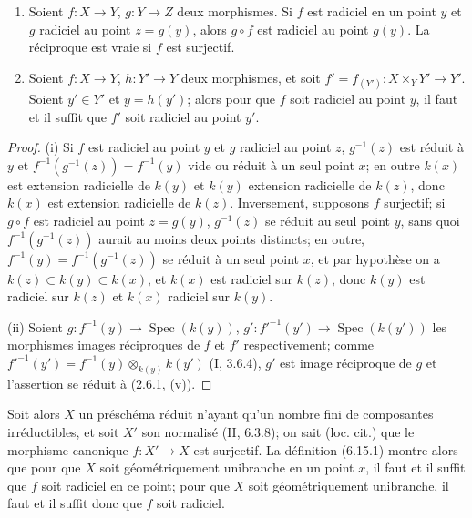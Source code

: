 \begin{lemma}[6.15.3.1]
\label{IV.2.s6.15.3.1-fr}
\begin{enumerate}
\item[(i)] Soient $f:X\to Y$, $g:Y\to Z$ deux morphismes. Si $f$ est
radiciel en un point $y$ et $g$ radiciel au point $z=g(y)$, alors $g\circ f$
est radiciel au point $g(y)$. La réciproque est vraie si $f$ est surjectif.
\item[(ii)] Soient $f:X\to Y$, $h:Y'\to Y$ deux morphismes, et soit
$f'=f_{(Y')}:X\times_Y Y'\to Y'$. Soient $y'\in Y'$ et $y=h(y')$; alors
pour que $f$ soit radiciel au point $y$, il faut et il suffit que $f'$ soit
radiciel au point $y'$.
\end{enumerate}
\end{lemma}

\begin{proof}
(i) Si $f$ est radiciel au point $y$ et $g$ radiciel au point $z$,
$g^{-1}(z)$ est réduit à $y$ et
$f^{-1}(g^{-1}(z))=f^{-1}(y)$ vide ou réduit à un seul point $x$; en
outre $k(x)$ est extension radicielle de $k(y)$ et $k(y)$ extension
radicielle de $k(z)$, donc $k(x)$ est extension radicielle de $k(z)$.
Inversement, supposons $f$ surjectif; si $g\circ f$ est radiciel au point
$z=g(y)$, $g^{-1}(z)$ se réduit au seul point $y$, sans quoi
$f^{-1}(g^{-1}(z))$ aurait au moins deux points distincts; en outre,
$f^{-1}(y)=f^{-1}(g^{-1}(z))$ se réduit à un seul point $x$, et par
hypothèse on a $k(z)\subset k(y)\subset k(x)$, et $k(x)$ est radiciel sur
$k(z)$, donc $k(y)$ est radiciel sur $k(z)$ et $k(x)$ radiciel sur $k(y)$.

(ii) Soient $g:f^{-1}(y)\to\operatorname{Spec}(k(y))$,
$g':f'^{-1}(y')\to\operatorname{Spec}(k(y'))$ les morphismes images
réciproques de $f$ et $f'$ respectivement; comme
$f'^{-1}(y')=f^{-1}(y)\otimes_{k(y)}k(y')$ (I, 3.6.4), $g'$ est image
réciproque de $g$ et l'assertion se réduit à (2.6.1, (v)).
\end{proof}

Soit alors $X$ un préschéma réduit n'ayant qu'un nombre fini de
composantes irréductibles, et soit $X'$ son normalisé (II, 6.3.8); on sait
(loc. cit.) que le morphisme canonique $f:X'\to X$ est surjectif. La
définition (6.15.1) montre alors que pour que $X$ soit géométriquement
unibranche en un point $x$, il faut et il suffit que $f$ soit radiciel en ce
point; pour que $X$ soit géométriquement unibranche, il faut et il suffit
donc que $f$ soit radiciel.

